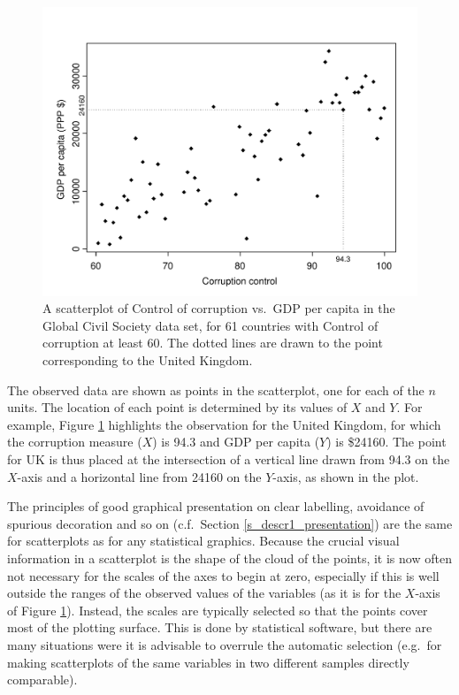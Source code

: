 \begin{figure}
\caption{A scatterplot of Control of corruption vs.\ GDP per capita in
the Global Civil Society data set, for 61 countries with Control of
corruption at least 60. The dotted lines are drawn to the point
corresponding to the
United Kingdom.}
\label{f_corruption1}
\vspace*{-3ex}
\includegraphics[width=14cm]{corruption1}
\vspace*{-6ex}
\end{figure}

The observed data are shown as points in the scatterplot, one for each
of the $n$ units. The location of each point is determined by its values
of $X$ and $Y$. For example, Figure \ref{f_corruption1} highlights the
observation for the United Kingdom, for which the corruption measure
($X$) is 94.3 and GDP per capita ($Y$) is \$24160. The point for UK is
thus placed at the intersection of a vertical line drawn from 94.3 on
the $X$-axis and a horizontal line from 24160 on the $Y$-axis, as shown
in the plot.

The principles of good graphical presentation on clear labelling,
avoidance of spurious decoration and so on (c.f.\ Section
\ref{s_descr1_presentation}) are the same for scatterplots as for any
statistical graphics. Because the crucial visual information in a
scatterplot is the shape of the cloud of the points, it is now often not
necessary for the scales of the axes to begin at zero, especially if
this is well outside the ranges of the observed values of the variables
(as it is for the $X$-axis of Figure \ref{f_corruption1}). Instead, the
scales are typically selected so that the points cover most of the
plotting surface. This is done by statistical software,
but there are many situations were it is advisable to overrule the
automatic selection (e.g.\ for making scatterplots of the same variables
in two different samples directly comparable).

